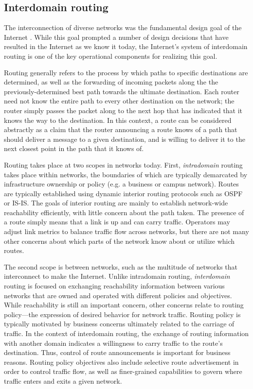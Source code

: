 \subsection{Interdomain routing}

The interconnection of diverse networks was the fundamental design goal of the
Internet \cite{Clark:1988kl}. While this goal prompted a number of design
decisions that have resulted in the Internet as we know it today, the
Internet's system of interdomain routing is one of the key operational
components for realizing this goal.

Routing generally refers to the process by which paths to specific destinations
are determined, as well as the forwarding of incoming packets along the the
previously-determined best path towards the ultimate destination. Each router
need not know the entire path to every other destination on the network; the
router simply passes the packet along to the next hop that has indicated that
it knows the way to the destination. In this context, a route can be considered
abstractly as a claim that the router announcing a route knows of a path that
should deliver a message to a given destination, and is willing to deliver it
to the next closest point in the path that it knows of.

Routing takes place at two scopes in networks today. First, \emph{intradomain}
routing takes place within networks, the boundaries of which are typically
demarcated by infrastructure ownership or policy (e.g. a business or campus
network). Routes are typically established using dynamic interior routing
protocols such as OSPF or IS-IS. The goals of interior routing are mainly to
establish network-wide reachability efficiently, with little concern about the
path taken. The presence of a route simply means that a link is up and can
carry traffic. Operators may adjust link metrics to balance traffic flow across
networks, but there are not many other concerns about which parts of the
network know about or utilize which routes.

The second scope is between networks, such as the multitude of networks that
interconnect to make the Internet. Unlike intradomain routing,
\emph{interdomain} routing is focused on exchanging reachability information
between various networks that are owned and operated with different policies
and objectives. While reachability is still an important concern, other
concerns relate to routing policy---the expression of desired behavior for
network traffic. Routing policy is typically motivated by business concerns
ultimately related to the carriage of traffic. In the context of interdomain
routing, the exchange of routing information with another domain indicates a
willingness to carry traffic to the route's destination. Thus, control of route
announcements is important for business reasons. Routing policy objectives also
include selective route advertisement in order to control traffic flow, as well
as finer-grained capabilities to govern where traffic enters and exits a given
network.

